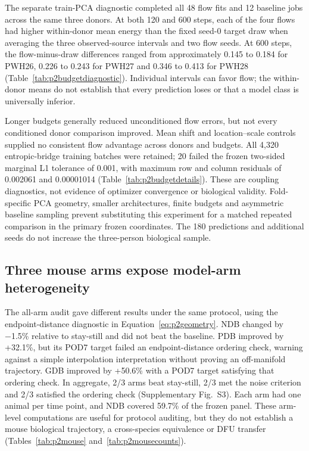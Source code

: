 \documentclass[10pt,a4paper]{article}
\begin{document}
The separate train-PCA diagnostic completed all 48 flow fits and 12 baseline jobs across the same three donors. At both 120 and 600 steps, each of the four flows had higher within-donor mean energy than the fixed seed-0 target draw when averaging the three observed-source intervals and two flow seeds. At 600 steps, the flow-minus-draw differences ranged from approximately 0.145 to 0.184 for PWH26, 0.226 to 0.243 for PWH27 and 0.346 to 0.413 for PWH28 (Table~\ref{tab:p2budgetdiagnostic}). Individual intervals can favor flow; the within-donor means do not establish that every prediction loses or that a model class is universally inferior.

Longer budgets generally reduced unconditioned flow errors, but not every conditioned donor comparison improved. Mean shift and location--scale controls supplied no consistent flow advantage across donors and budgets. All 4,320 entropic-bridge training batches were retained; 20 failed the frozen two-sided marginal L1 tolerance of 0.001, with maximum row and column residuals of 0.002061 and 0.00001014 (Table~\ref{tab:p2budgetdetails}). These are coupling diagnostics, not evidence of optimizer convergence or biological validity. Fold-specific PCA geometry, smaller architectures, finite budgets and asymmetric baseline sampling prevent substituting this experiment for a matched repeated comparison in the primary frozen coordinates. The 180 predictions and additional seeds do not increase the three-person biological sample.

\subsection{Three mouse arms expose model-arm heterogeneity}

The all-arm audit gave different results under the same protocol, using the endpoint-distance diagnostic in Equation~\eqref{eq:p2geometry}. NDB changed by −1.5\% relative to stay-still and did not beat the baseline. PDB improved by +32.1\%, but its POD7 target failed an endpoint-distance ordering check, warning against a simple interpolation interpretation without proving an off-manifold trajectory. GDB improved by +50.6\% with a POD7 target satisfying that ordering check. In aggregate, 2/3 arms beat stay-still, 2/3 met the noise criterion and 2/3 satisfied the ordering check (Supplementary Fig.~S3\label{call:p2f7}). Each arm had one animal per time point, and NDB covered 59.7\% of the frozen panel. These arm-level computations are useful for protocol auditing, but they do not establish a mouse biological trajectory, a cross-species equivalence or DFU transfer (Tables~\ref{tab:p2mouse} and~\ref{tab:p2mousecounts}).
\end{document}
